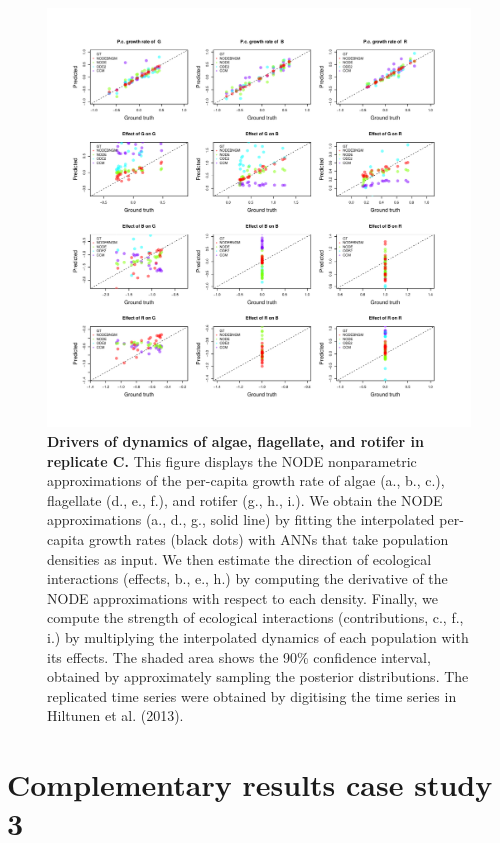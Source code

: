 \documentclass[11pt, oneside]{article}
\begin{document}
\newpage
\begin{figure}[H]
\includegraphics[width=1\linewidth,page=14]{figures/figures_supplementary.pdf}
\caption{
    \textbf{Drivers of dynamics of algae, flagellate, and rotifer in replicate C.}
    This figure displays the NODE nonparametric approximations of the per-capita growth rate of algae (a., b., c.), flagellate (d., e., f.), and rotifer (g., h., i.).
    We obtain the NODE approximations (a., d., g., solid line) by fitting the interpolated per-capita growth rates (black dots) with ANNs that take population densities as input.
    We then estimate the direction of ecological interactions (effects, b., e., h.) by computing the derivative of the NODE approximations with respect to each density.
    Finally, we compute the strength of ecological interactions (contributions, c., f., i.) by multiplying the interpolated dynamics of each population with its effects.
    The shaded area shows the 90\% confidence interval, obtained by approximately sampling the posterior distributions. 
    The replicated time series were obtained by digitising the time series in Hiltunen et al. (2013).
}
\end{figure}
\newpage

\newpage
\section{Complementary results case study 3}
\end{document}
